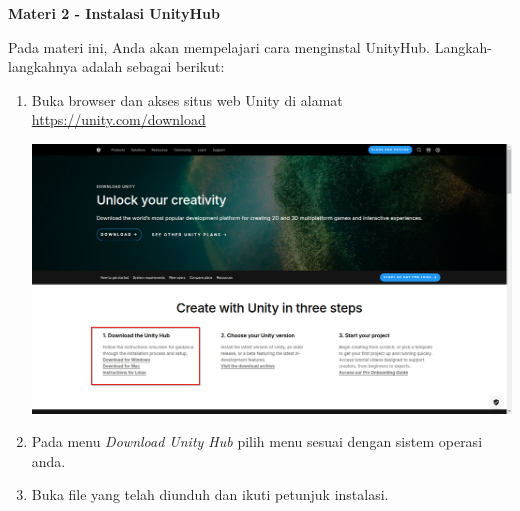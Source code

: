 \documentclass{article}
\begin{document}
    \begin{flushleft}
        \textbf{Materi 2 - Instalasi UnityHub}
        \newline

        Pada materi ini, Anda akan mempelajari cara menginstal UnityHub. Langkah-langkahnya adalah sebagai berikut:

        \begin{enumerate}
            \item Buka browser dan akses situs web Unity di alamat \href{https://unity.com/download}{https://unity.com/download}

            \includegraphics[scale=0.3]{03_download_unity.png}

            \item Pada menu \textit{Download Unity Hub} pilih menu sesuai dengan sistem operasi anda.
            \item Buka file yang telah diunduh dan ikuti petunjuk instalasi.
            

\end{enumerate}
\end{flushleft}
\end{document}
